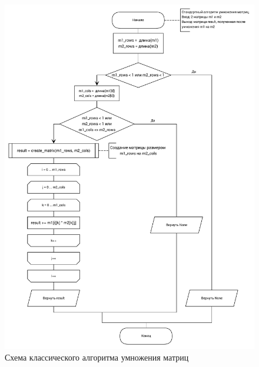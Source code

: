 \begin{figure}[H]
\centering
\includegraphics[width=\textwidth]{inc/img/standard_mult.pdf}
\caption{Схема классического алгоритма умножения матриц}
\label{fig:classic_mult_scheme}
\end{figure}

